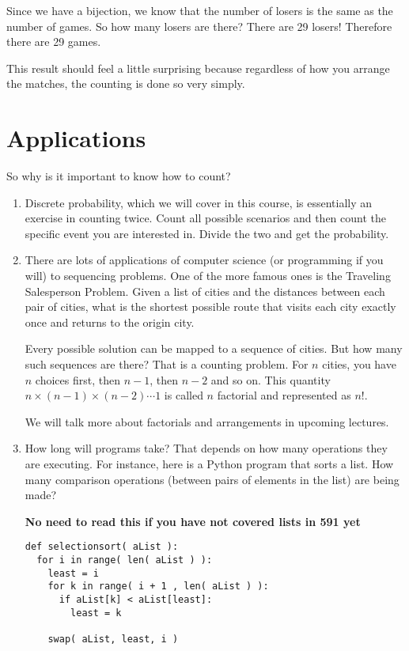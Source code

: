 \documentclass[12pt]{article}
\begin{document}
Since we have a bijection, we know that the number of losers is the same as the number of games. So how many losers are there? There are 29 losers! Therefore there are 29 games.

This result should feel a little surprising because regardless of how you arrange the matches, the counting is done so very simply.

\section*{Applications}
So why is it important to know how to count?

\begin{enumerate}
\item Discrete probability, which we will cover in this course, is essentially an exercise in counting twice. Count all possible scenarios and then count the specific event you are interested in. Divide the two and get the probability.
\item There are lots of applications of computer science (or programming if you will) to sequencing problems. One of the more famous ones is the Traveling Salesperson Problem.  Given a list of cities and the distances between each pair of cities, what is the shortest possible route that visits each city exactly once and returns to the origin city. 

Every possible solution can be mapped to a sequence of cities. But how many such sequences are there? That is a counting problem. For $n$ cities, you have $n$ choices first, then $n-1$, then $n-2$ and so on. This quantity $n \times (n-1) \times (n-2) \cdots 1$ is called $n$ factorial and represented as $n!$. 

We will talk more about factorials and arrangements in upcoming lectures.

\item How long will programs take? That depends on how many operations they are executing. For instance, here is a Python program that sorts a list. How many comparison operations (between pairs of elements in the list) are being made? 

\textbf{No need to read this if you have not covered lists in 591 yet}


\begin{verbatim}
def selectionsort( aList ):
  for i in range( len( aList ) ):
    least = i
    for k in range( i + 1 , len( aList ) ):
      if aList[k] < aList[least]:
        least = k
 
    swap( aList, least, i )
 

\end{verbatim}
\end{enumerate}
\end{document}
